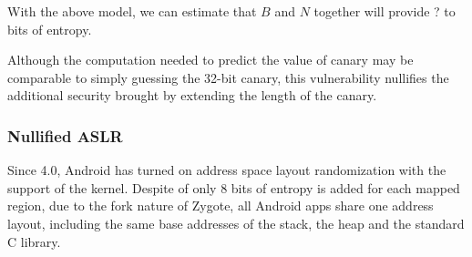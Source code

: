 
With the above model, we can estimate that $B$ and $N$ together will provide ? to ~ bits of entropy.

Although the computation needed to predict the value of canary may be comparable to simply guessing the 32-bit canary, this vulnerability nullifies the additional security brought by extending the length of the canary.

\subsubsection{Nullified ASLR}

Since 4.0, Android has turned on address space layout randomization with the support of the kernel. Despite of only 8 bits of entropy is added for each mapped region, due to the fork nature of Zygote, all Android apps share one address layout, including the same base addresses of the stack, the heap and the standard C library.

